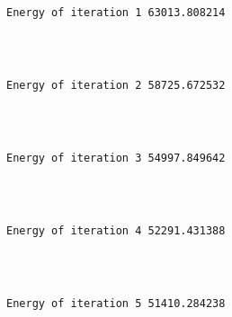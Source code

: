 \documentclass[11pt]{article}
\begin{document}
    \begin{Verbatim}[commandchars=\\\{\}]
Energy of iteration 1 63013.808214 


    \end{Verbatim}

    \begin{center}
    \end{center}
    { \hspace*{\fill} \\}
    
    \begin{Verbatim}[commandchars=\\\{\}]
Energy of iteration 2 58725.672532 


    \end{Verbatim}

    \begin{center}
    \end{center}
    { \hspace*{\fill} \\}
    
    \begin{Verbatim}[commandchars=\\\{\}]
Energy of iteration 3 54997.849642 


    \end{Verbatim}

    \begin{center}
    \end{center}
    { \hspace*{\fill} \\}
    
    \begin{Verbatim}[commandchars=\\\{\}]
Energy of iteration 4 52291.431388 


    \end{Verbatim}

    \begin{center}
    \end{center}
    { \hspace*{\fill} \\}
    
    \begin{Verbatim}[commandchars=\\\{\}]
Energy of iteration 5 51410.284238 


    \end{Verbatim}
\end{document}
